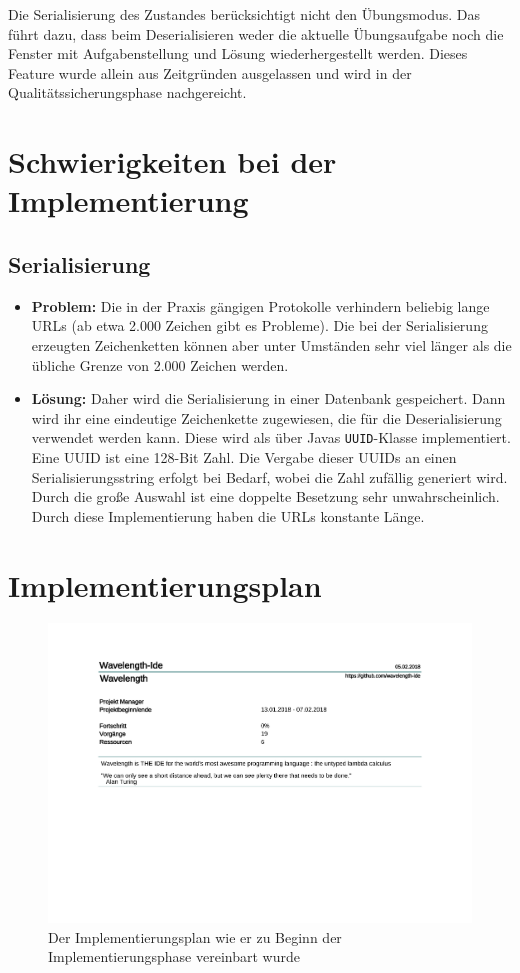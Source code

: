 \documentclass[parskip=full,11pt,twoside]{scrartcl}
\begin{document}
Die Serialisierung des Zustandes berücksichtigt nicht den Übungsmodus. 
Das führt dazu, dass beim Deserialisieren weder die aktuelle Übungsaufgabe noch die Fenster mit Aufgabenstellung und Lösung wiederhergestellt werden.
Dieses Feature wurde allein aus Zeitgründen ausgelassen und wird in der Qualitätssicherungsphase nachgereicht.

\section{Schwierigkeiten bei der Implementierung}
\subsection{Serialisierung}
\begin{itemize}
\item[] \textbf{Problem:} 
Die in der Praxis gängigen Protokolle verhindern beliebig lange URLs (ab etwa 2.000 Zeichen gibt es Probleme). 
Die bei der Serialisierung erzeugten Zeichenketten können aber unter Umständen sehr viel länger als die übliche Grenze von 2.000 Zeichen werden.
\item[] \textbf{Lösung:} 
Daher wird die Serialisierung in einer Datenbank gespeichert. 
Dann wird ihr eine eindeutige Zeichenkette zugewiesen, die für die Deserialisierung verwendet werden kann.
Diese wird als über Javas \texttt{UUID}-Klasse implementiert.
Eine UUID ist eine 128-Bit Zahl.
Die Vergabe dieser UUIDs an einen Serialisierungsstring erfolgt bei Bedarf, wobei die Zahl zufällig generiert wird.
Durch die große Auswahl ist eine doppelte Besetzung sehr unwahrscheinlich.
Durch diese Implementierung haben die URLs konstante Länge.
\end{itemize}

\newpage
\section{Implementierungsplan}
\begin{figure}[h]
\hspace*{-1cm}
\includegraphics[trim={0, 9.5cm, 0, 0}, clip, scale=0.65, page=4]{Implementierungsplan/Implementierungsplan-vorher.pdf}
\caption{Der Implementierungsplan wie er zu Beginn der Implementierungsphase vereinbart wurde}
\end{figure}
\end{document}
